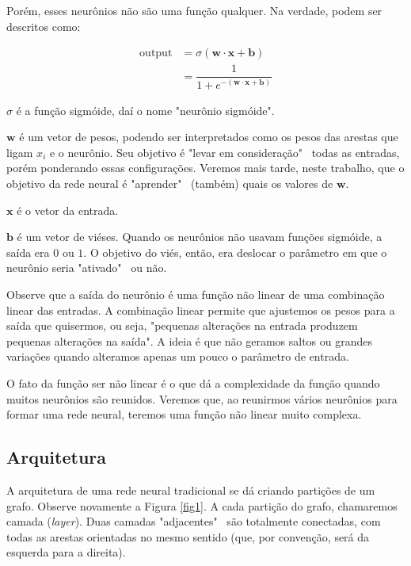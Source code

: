 \documentclass{article}
\begin{document}
            Porém, esses neurônios não são uma função qualquer. Na verdade, podem ser descritos como:

            \begin{equation}
                \begin{split}
                    \textrm{output} &= \sigma(\mathbf{w} \cdot \mathbf{x} + \mathbf{b}) \\
                                    &= \dfrac{1}{1 + e^{-(\mathbf{w} \cdot \mathbf{x} + \mathbf{b})}}
                \end{split}
            \end{equation}

            $\sigma$ é a função sigmóide, daí o nome "neurônio sigmóide".

            $\mathbf{w}$ é um vetor de pesos, podendo ser interpretados como os pesos das arestas que ligam $x_i$ e o neurônio.
            Seu objetivo é "levar em consideração" \ todas as entradas, porém ponderando essas configurações.
            Veremos mais tarde, neste trabalho, que o objetivo da rede neural é "aprender" \ (também) quais os valores de $\mathbf{w}$.

            $\mathbf{x}$ é o vetor da entrada.
            
            $\mathbf{b}$ é um vetor de viéses.
            Quando os neurônios não usavam funções sigmóide, a saída era $0$ ou $1$.
            O objetivo do viés, então, era deslocar o parâmetro em que o neurônio seria "ativado" \ ou não.

            Observe que a saída do neurônio é uma função não linear de uma combinação linear das entradas.
            A combinação linear permite que ajustemos os pesos para a saída que quisermos, ou seja, "pequenas alterações na entrada produzem pequenas alterações na saída".
            A ideia é que não geramos saltos ou grandes variações quando alteramos apenas um pouco o parâmetro de entrada.
            
            O fato da função ser não linear é o que dá a complexidade da função quando muitos neurônios são reunidos.
            Veremos que, ao reunirmos vários neurônios para formar uma rede neural, teremos uma função não linear muito complexa.

        \subsection{Arquitetura}

            A arquitetura de uma rede neural tradicional se dá criando partições de um grafo.
            Observe novamente a Figura \ref{fig1}.
            A cada partição do grafo, chamaremos camada (\textit{layer}).
            Duas camadas "adjacentes" \ são totalmente conectadas, com todas as arestas orientadas no mesmo sentido (que, por convenção, será da esquerda para a direita).
\end{document}
